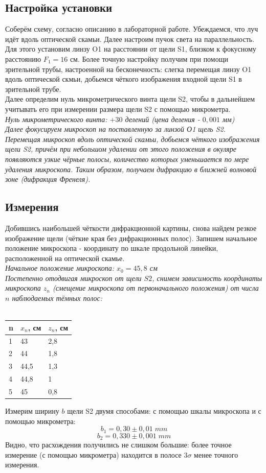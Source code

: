 \documentclass[a4paper]{article}
\begin{document}
\subsection*{Настройка установки}
Соберём схему, согласно описанию в лабораторной работе. Убеждаемся, что луч идёт вдоль оптической скамьи. Далее настроим пучок света на параллельность. Для этого установим линзу O1 на расстоянии от щели S1, близком к фокусному расстоянию $F_1 = 16$ см. Более точную настройку получим при помощи зрительной трубы, настроенной на бесконечность: слегка перемещая линзу O1 вдоль оптической скмьи, добьемся чёткого изображения входной щели S1 в зрительной трубе.\\
Далее определим нуль микрометрического винта щели S2, чтобы в дальнейшем учитывать его при измерении размера щели S2 с помощью микрометра. \\
\em Нуль микрометрического винта: $+30$ делений (цена деления - $0,001$ мм)\em \\
Далее фокусируем микроскоп на поставленную за линзой О1 щель S2. Перемещая микроскоп вдоль оптической скамьи, добьемся чёткого изображения щели S2, причём при небольшом удалении от этого положения в окуляре появляются узкие чёрные полосы, количество которых уменьшается по мере удаления микроскопа. Таким образом, получаем дифракцию в ближней волновой зоне (дифракция Френеля).
\subsection*{Измерения}
Добившись наибольшей чёткости дифракционной картины, снова найдем резкое изображение щели (чёткие края без дифракционных полос). Запишем начальное положение микроскопа - координату по шкале продольной линейки, расположенной на оптической скамье. \\
\em Начальное положение микроскопа: $x_0 = 45,8$ см\em \\
Постепенно отодвигая микроскоп от щели $S2$, снимем зависимость координаты микроскопа $z_n$ (смещение микроскопа от первоначального положения) от числа $n$ наблюдаемых тёмных полос:\\
\\
\begin{center}
\begin{tabular}{|l|l|l|}
\hline
n & $x_n$, см & $z_n$, см\\
\hline
1 & 43 & 2,8 \\
\hline
2 & 44 & 1,8\\
\hline
3 & 44,5 & 1,3\\
\hline
4 & 44,8 & 1\\
\hline
5 & 45 & 0,8\\
\hline
\end{tabular}
\end{center}
Измерим ширину $b$ щели S2 двумя способами: с помощью шкалы микроскопа и с помощью микрометра:\\
$$b_1 = 0,30 \pm 0,01 \; mm$$
$$b_2 = 0,330 \pm 0,001 \; mm$$
Видно, что расхождения получились не слишком большие: более точное измерение (с помощью микрометра) находится в полосе $3\sigma$ менее точного измерения.\\
\end{document}
